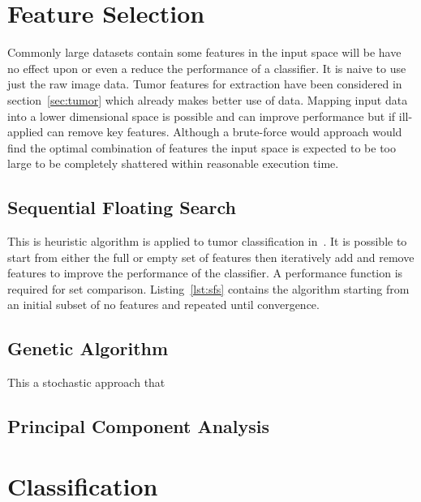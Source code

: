 \documentclass[journal]{IEEEtran}
\begin{document}
\section{Feature Selection}
\label{sec:selection}

Commonly large datasets contain some features in the input space will be have no effect upon or even a reduce the performance of a classifier.
It is naive to use just the raw image data.
Tumor features for extraction have been considered in section~\ref{sec:tumor} which already makes better use of data. 
Mapping input data into a lower dimensional space is possible and can improve performance but if ill-applied can remove key features.
Although a brute-force would approach would find the optimal combination of features the input space is expected to be too large to be completely shattered within reasonable execution time. 


\subsection{Sequential Floating Search}

This is heuristic algorithm is applied to tumor classification in~\cite{hau07feat}.
It is possible to start from either the full or empty set of features then iteratively add and remove features to improve the performance of the classifier. 
A performance function is required for set comparison. 
Listing~\ref{lst:sfs} contains the algorithm starting from an initial subset of no features and repeated until convergence.




\subsection{Genetic Algorithm}
This a stochastic approach that   


\subsection{Principal Component Analysis}








\section{Classification}
\label{sec:class}
\end{document}
